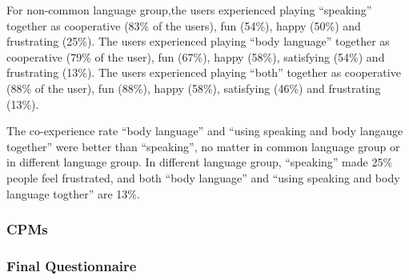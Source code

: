 For non-common language group,the users experienced playing “speaking” together as cooperative (83\% of the users), fun (54\%), happy (50\%) and frustrating (25\%). The users experienced playing “body language” together as cooperative (79\% of the user), fun (67\%), happy (58\%), satisfying (54\%) and frustrating (13\%). The users experienced playing “both” together as cooperative (88\% of the user), fun (88\%), happy (58\%), satisfying (46\%) and frustrating (13\%). 

The co-experience rate ``body language'' and ``using speaking and body langauge together'' were better than ``speaking'', no matter in common language group or in different language group. In different language group, ``speaking'' made 25\% people feel frustrated, and both ``body language'' and ``using speaking and body language togther'' are 13\%.

\subsubsection{CPMs}
\subsubsection{Final Questionnaire}


